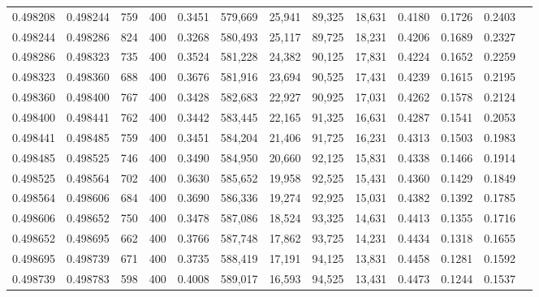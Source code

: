 \begin{tabular}{rrrrrrrrrrrrr}
0.498208 & 0.498244 &    759 & 400 &                                     0.3451 & 579,669 &  25,941 &  89,325 &  18,631 & 0.4180 & 0.1726 & 0.2403 \\
0.498244 & 0.498286 &    824 & 400 &                                     0.3268 & 580,493 &  25,117 &  89,725 &  18,231 & 0.4206 & 0.1689 & 0.2327 \\
0.498286 & 0.498323 &    735 & 400 &                                     0.3524 & 581,228 &  24,382 &  90,125 &  17,831 & 0.4224 & 0.1652 & 0.2259 \\
0.498323 & 0.498360 &    688 & 400 &                                     0.3676 & 581,916 &  23,694 &  90,525 &  17,431 & 0.4239 & 0.1615 & 0.2195 \\
0.498360 & 0.498400 &    767 & 400 &                                     0.3428 & 582,683 &  22,927 &  90,925 &  17,031 & 0.4262 & 0.1578 & 0.2124 \\
0.498400 & 0.498441 &    762 & 400 &                                     0.3442 & 583,445 &  22,165 &  91,325 &  16,631 & 0.4287 & 0.1541 & 0.2053 \\
0.498441 & 0.498485 &    759 & 400 &                                     0.3451 & 584,204 &  21,406 &  91,725 &  16,231 & 0.4313 & 0.1503 & 0.1983 \\
0.498485 & 0.498525 &    746 & 400 &                                     0.3490 & 584,950 &  20,660 &  92,125 &  15,831 & 0.4338 & 0.1466 & 0.1914 \\
0.498525 & 0.498564 &    702 & 400 &                                     0.3630 & 585,652 &  19,958 &  92,525 &  15,431 & 0.4360 & 0.1429 & 0.1849 \\
0.498564 & 0.498606 &    684 & 400 &                                     0.3690 & 586,336 &  19,274 &  92,925 &  15,031 & 0.4382 & 0.1392 & 0.1785 \\
0.498606 & 0.498652 &    750 & 400 &                                     0.3478 & 587,086 &  18,524 &  93,325 &  14,631 & 0.4413 & 0.1355 & 0.1716 \\
0.498652 & 0.498695 &    662 & 400 &                                     0.3766 & 587,748 &  17,862 &  93,725 &  14,231 & 0.4434 & 0.1318 & 0.1655 \\
0.498695 & 0.498739 &    671 & 400 &                                     0.3735 & 588,419 &  17,191 &  94,125 &  13,831 & 0.4458 & 0.1281 & 0.1592 \\
0.498739 & 0.498783 &    598 & 400 &                                     0.4008 & 589,017 &  16,593 &  94,525 &  13,431 & 0.4473 & 0.1244 & 0.1537 \\

\end{tabular}
